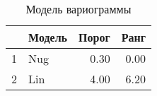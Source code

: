 \begin{table}[H]
\centering
\begin{tabular}{rlrr}
  \hline
 & Модель & Порог & Ранг \\ 
  \hline
1 & Nug & 0.30 & 0.00 \\ 
  2 & Lin & 4.00 & 6.20 \\ 
   \hline
\end{tabular}
\caption{Модель вариограммы} 
\label{table:manual_model}
\end{table}
